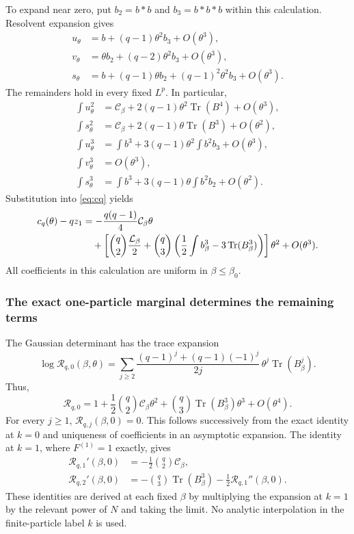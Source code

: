 \documentclass[11pt,reqno]{amsart}
\numberwithin{equation}{section}
\theoremstyle{plain}
\theoremstyle{definition}
\newcommand{\Tr}{\operatorname{Tr}}
\newcommand{\be}{\beta}
\begin{document}
To expand near zero, put $b_2=b*b$ and $b_3=b*b*b$ within this calculation. Resolvent expansion gives
\begin{align}
 u_\theta&=b+(q-1)\theta^2b_3+O(\theta^3),\label{eq:u-expand}\\
 v_\theta&=\theta b_2+(q-2)\theta^2b_3+O(\theta^3),\label{eq:v-expand}\\
 s_\theta&=b+(q-1)\theta b_2+(q-1)^2\theta^2b_3+O(\theta^3).\label{eq:s-expand}
\end{align}
The remainders hold in every fixed $L^p$. In particular,
\begin{align}
 \int u_\theta^2&=\mathcal C_\be+2(q-1)\theta^2\Tr(B^4)+O(\theta^3),\label{eq:u2}\\
 \int s_\theta^2&=\mathcal C_\be+2(q-1)\theta\Tr(B^3)+O(\theta^2),\label{eq:s2}\\
 \int u_\theta^3&=\int b^3+3(q-1)\theta^2\int b^2b_3+O(\theta^3),\label{eq:u3}\\
 \int v_\theta^3&=O(\theta^3),\label{eq:v3}\\
 \int s_\theta^3&=\int b^3+3(q-1)\theta\int b^2b_2+O(\theta^2).\label{eq:s3}
\end{align}
Substitution into \eqref{eq:cq} yields
\begin{align}\label{eq:cq-expand}
 c_q(\theta)-qz_1
 &=-\frac{q(q-1)}4\mathcal C_\be\theta\notag\\
 &\quad+\left[\binom q2\frac{\mathcal L_\be}{2}
 +\binom q3\left(\frac12\int b_\be^3-3\Tr(B_\be^3)\right)\right]\theta^2
 +O(\theta^3).
\end{align}
All coefficients in this calculation are uniform in $\be\leq\be_0$.

\subsubsection{The exact one-particle marginal determines the remaining terms}
The Gaussian determinant has the trace expansion
\begin{equation}\label{eq:Rq-log}
 \log\mathcal R_{q,0}(\be,\theta)
 =\sum_{j\geq2}\frac{(q-1)^j+(q-1)(-1)^j}{2j}\,
 \theta^j\Tr(B_\be^j).
\end{equation}
Thus,
\begin{equation}\label{eq:Rq-leading-expand}
 \mathcal R_{q,0}
 =1+\frac12\binom q2\mathcal C_\be\theta^2
    +\binom q3\Tr(B_\be^3)\theta^3+O(\theta^4).
\end{equation}
For every $j\geq1$, $\mathcal R_{q,j}(\be,0)=0$. This follows successively from the exact identity at $k=0$ and uniqueness of coefficients in an asymptotic expansion. The identity at $k=1$, where $F^{(1)}=1$ exactly, gives
\begin{align}
 \mathcal R_{q,1}'(\be,0)&=-\frac12\binom q2\mathcal C_\be,\label{eq:k1-second}\\
 \mathcal R_{q,2}'(\be,0)&=-\binom q3\Tr(B_\be^3)-\frac12\mathcal R_{q,1}''(\be,0).\label{eq:k1-third}
\end{align}
These identities are derived at each fixed $\be$ by multiplying the expansion at $k=1$ by the relevant power of $N$ and taking the limit. No analytic interpolation in the finite-particle label $k$ is used.
\end{document}
